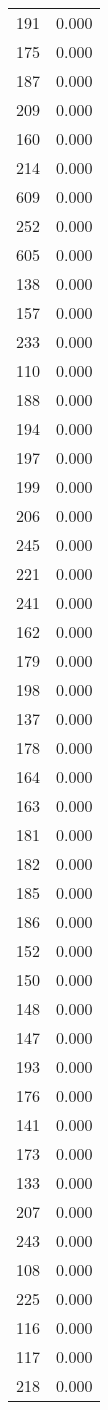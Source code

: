 \begin{table}
\begin{tabular}{lr}
191 & 0.000 \\
175 & 0.000 \\
187 & 0.000 \\
209 & 0.000 \\
160 & 0.000 \\
214 & 0.000 \\
609 & 0.000 \\
252 & 0.000 \\
605 & 0.000 \\
138 & 0.000 \\
157 & 0.000 \\
233 & 0.000 \\
110 & 0.000 \\
188 & 0.000 \\
194 & 0.000 \\
197 & 0.000 \\
199 & 0.000 \\
206 & 0.000 \\
245 & 0.000 \\
221 & 0.000 \\
241 & 0.000 \\
162 & 0.000 \\
179 & 0.000 \\
198 & 0.000 \\
137 & 0.000 \\
178 & 0.000 \\
164 & 0.000 \\
163 & 0.000 \\
181 & 0.000 \\
182 & 0.000 \\
185 & 0.000 \\
186 & 0.000 \\
152 & 0.000 \\
150 & 0.000 \\
148 & 0.000 \\
147 & 0.000 \\
193 & 0.000 \\
176 & 0.000 \\
141 & 0.000 \\
173 & 0.000 \\
133 & 0.000 \\
207 & 0.000 \\
243 & 0.000 \\
108 & 0.000 \\
225 & 0.000 \\
116 & 0.000 \\
117 & 0.000 \\
218 & 0.000 \\

\end{tabular}
\end{table}
